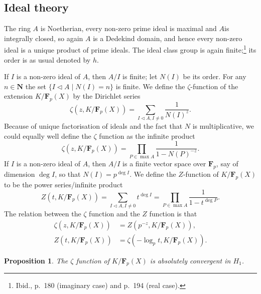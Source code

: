 \documentclass[10pt]{article}
\newtheorem{prop}[theo]{Proposition}
\theoremstyle{definition}
\def\NN{\mathbf{N}}
\def\FF{\mathbf{F}}
\newcommand{\tri}{\mathbin{\triangleleft}}
\def\fntwfo{Ibid., p.~180 (imaginary case) and p.~194 (real case).}
\begin{document}
\subsection{Ideal theory}
\label{ch:3.2}

The ring $A$ is Noetherian, every non-zero prime ideal is maximal and $A$is integrally closed, so again $A$ is a Dedekind domain, and hence every non-zero ideal is a unique product of prime ideals.
The ideal class group is again finite;\footnote{\fntwfo} its order is as usual denoted by $h$.

If $I$ is a non-zero ideal of $A$, then $A/I$ is finite; let $N(I)$ be its order.
For any $n \in \NN$ the set $\{I \tri A \mid N(I) = n\}$ is finite.
We define the $\zeta$-function of the extension $K/\FF_p(X)$ by the Dirichlet series
\begin{equation}
\label{3.2.1}
\zeta(z,K/\FF_p(X))
= \sum_{I \tri A, I\not=0} \frac{1}{N(I)^z}.
\end{equation}
Because of unique factorisation of ideals and the fact that $N$ is multiplicative, we could equally well define the $\zeta$ function as the infinite product
\begin{equation}
\label{3.2.2}
\zeta(z,K/\FF_p(X))
= \prod_{P \in \max A} \frac{1}{1 - N(P)^{-z}}.
\end{equation}
If $I$ is a non-zero ideal of $A$, then $A/I$ is a finite vector space over $\FF_p$, say of dimension $\deg I$, so that $N(I) = p^{\deg I}$.
We define the $Z$-function of $K / \FF_p(X)$ to be the power series/infinite product
\begin{equation}
\label{3.2.3}
Z(t, K/\FF_p(X))
= \sum_{I \tri A, I\not=0} t^{\deg I}
= \prod_{P \in \max A} \frac{1}{1 - t^{\deg P}}.
\end{equation}
The relation between the $\zeta$ function and the $Z$ function is that
\begin{align*}
\zeta(z, K/\FF_p(X))
&= Z(p^{-z}, K/\FF_p(X)),
\\
Z(t, K/\FF_p(X)) 
&= \zeta(-\log_p t, K/\FF_p(X)).
\end{align*}


\begin{prop}
\label{3.2.4}
The $\zeta$ function of $K/\FF_p(X)$ is absolutely convergent in $H_1$.
\end{prop}
\end{document}
